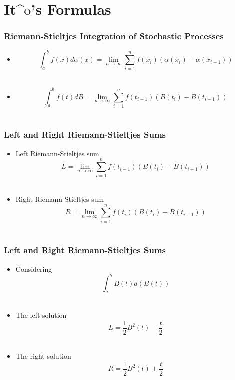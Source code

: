 \section{It$\mathrm{\^o}$'s Formulas}

%
%

\begin{frame}
  \frametitle{Riemann-Stieltjes Integration of Stochastic Processes}
  \begin{itemize}
  \item $$\int_{a}^{b} f(x) d\alpha(x)=\lim_{n\to\infty}\sum_{i=1}^{n} f(x_i) (\alpha(x_i)-\alpha(x_{i-1}))$$\\
  \item  $$\int_{a}^{b} f(t) dB=\lim_{n\to\infty}\sum_{i=1}^{n} f(t_{i-1}) (B(t_i)-B(t_{i-1}))$$\\
  \end{itemize}
\end{frame}


\begin{frame}
  \frametitle{Left and Right Riemann-Stieltjes Sums}
  \begin{itemize}
  \item Left Riemann-Stieltjes sum $$L=\lim_{n\to\infty}\sum_{i=1}^{n} f(t_{i-1}) (B(t_i)-B(t_{i-1}))$$\\
  \item Right Riemann-Stieltjes sum $$R=\lim_{n\to\infty}\sum_{i=1}^{n} f(t_i) (B(t_i)-B(t_{i-1}))$$\\

  \end{itemize}
\end{frame}
  
\begin{frame}
  \frametitle{Left and Right Riemann-Stieltjes Sums}
  \begin{itemize}
      \item Considering $$\int_{a}^{b}{B(t)d(B(t))}$$\\
  \item The left solution $$L=\frac{1}{2}B^2(t)-\frac{t}{2}$$\\
  \item The right solution $$R=\frac{1}{2}B^2(t)+\frac{t}{2}$$\\
  \end{itemize}  
\end{frame}
  
